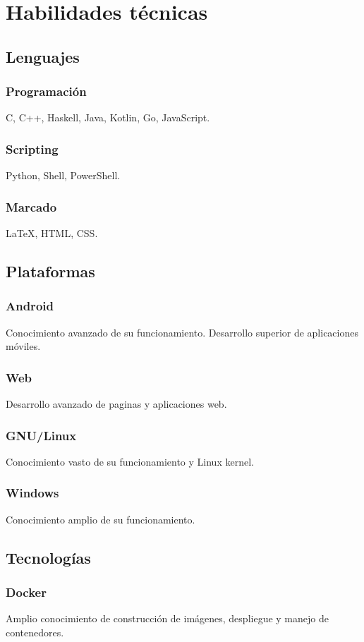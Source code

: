 \documentclass{article}
\begin{document}
    \section{Habilidades técnicas}
    \subsection{Lenguajes}
    \subsubsection{Programación}
    C, C++, Haskell, Java, Kotlin, Go, JavaScript.
    \subsubsection{Scripting}
    Python, Shell, PowerShell.
    \subsubsection{Marcado}
    {\LaTeX}, HTML, CSS.
    \subsection{Plataformas}
    \subsubsection{Android} Conocimiento avanzado de su funcionamiento. Desarrollo superior de aplicaciones móviles.
    \subsubsection{Web} Desarrollo avanzado de paginas y aplicaciones web.
    \subsubsection{GNU/Linux} Conocimiento vasto de su funcionamiento y Linux kernel. 
    \subsubsection{Windows} Conocimiento amplio de su funcionamiento.
    \subsection{Tecnologías} 
    \subsubsection{Docker} Amplio conocimiento  de construcción de imágenes, despliegue y manejo de contenedores.
\end{document}
